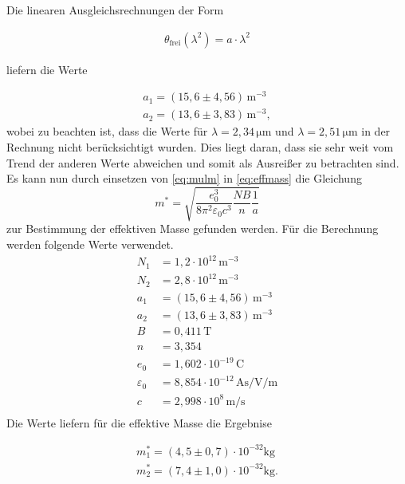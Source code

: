 \noindent
Die linearen Ausgleichsrechnungen der Form

\begin{align}
  \label{eq:mulm}
  \theta_\text{frei} (\lambda^2) = a \cdot \lambda^2
\end{align}

\noindent
liefern die Werte

\begin{align*}
  a_1 = (15,6 \pm 4,56) \, \si{\meter}^{-3} \\
  a_2 = (13,6 \pm 3,83) \, \si{\meter}^{-3},
\end{align*}
\noindent
wobei zu beachten ist, dass die Werte für $\lambda = 2,34 \, \si{\micro\metre}$ und $\lambda = 2,51 \, \si{\micro\metre}$ in der Rechnung nicht berücksichtigt wurden.
Dies liegt daran, dass sie sehr weit vom Trend der anderen Werte abweichen und somit als Ausreißer zu betrachten sind.
Es kann nun durch einsetzen von \autoref{eq:mulm} in \autoref{eq:effmass} die Gleichung
\begin{equation*}
  m^{*} = \sqrt{\frac{e_0^3}{8\pi^2 \varepsilon_0 c^3} \frac{N B}{n} \frac{1}{a}}
\end{equation*}
\noindent
zur Bestimmung der effektiven Masse gefunden werden. Für die Berechnung werden folgende Werte verwendet.
\begin{align*}
  N_1 &= 1,2 \cdot 10^{12} \, \si{\meter}^{-3} \\
  N_2 &= 2,8 \cdot 10^{12} \,\si{\meter}^{-3} \\
  a_1 &= (15,6 \pm 4,56) \, \si{\meter}^{-3} \\
  a_2 &= (13,6 \pm 3,83) \, \si{\meter}^{-3} \\
  B &= 0,411 \, \si{\tesla} \\
  n &= 3,354 \\
  e_0 &= 1,602 \cdot 10^{-19} \, \si{\coulomb} \\
  \varepsilon_0 &= 8,854 \cdot 10^{-12} \, \si{\ampere\second\per\volt\per\metre} \\
  c &= 2,998 \cdot 10^{8} \, \si{\metre\per\second} \\
\end{align*}
\noindent
Die Werte liefern für die effektive Masse die Ergebnise

\begin{align*}
  m_1^* = (4,5 \pm 0,7) \cdot 10^{-32} \si{\kilo\gram} \\
  m_2^* = (7,4 \pm 1,0) \cdot 10^{-32} \si{\kilo\gram}.
\end{align*}


